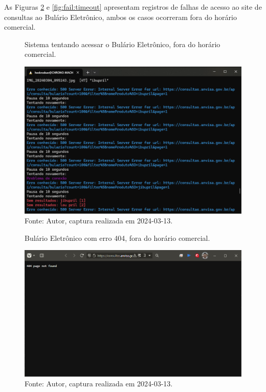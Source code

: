 As Figuras \ref{fig:fail:404} e \ref{fig:fail:timeout} apresentam registros de falhas de acesso ao site de consultas ao Bulário Eletrônico, ambos os casos ocorreram fora do horário comercial.

\begin{figure}[htbp]
    \centering
    \caption{Sistema tentando acessar o Bulário Eletrônico, fora do horário comercial.}
    \includegraphics[width=0.95\linewidth]{../pictures/Anvisa_domingo.png}
    \caption*{Fonte: Autor, captura realizada em 2024-03-13.}
    \label{fig:fail:domingo}
\end{figure}

\begin{figure}[htbp]
    \centering
    \caption{Bulário Eletrônico com erro 404, fora do horário comercial.}
    \includegraphics[width=0.95\linewidth]{../pictures/Anvisa_error_404.png}
    \caption*{Fonte: Autor, captura realizada em 2024-03-13.}
    \label{fig:fail:404}
\end{figure}

